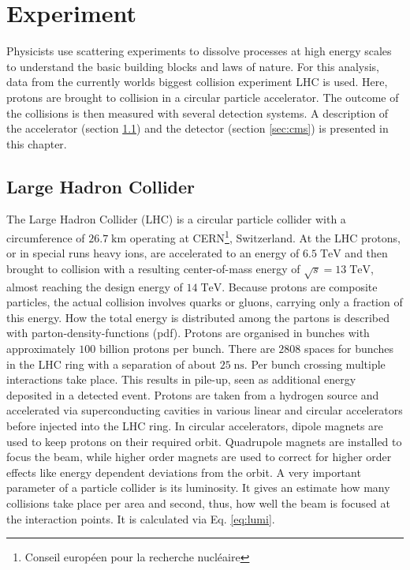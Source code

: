 \chapter{Experiment}
\label{ch:Exp}
	Physicists use scattering experiments to dissolve processes at high energy scales to understand the basic building blocks and laws of nature. For this analysis, data from the currently worlds biggest collision experiment LHC is used. Here, protons are brought to collision in a circular particle accelerator. The outcome of the collisions is then measured with several detection systems. A description of the accelerator (section \ref{sec:lhc}) and the detector (section \ref{sec:cms}) is presented in this chapter.
\section{Large Hadron Collider}
\label{sec:lhc}
	The Large Hadron Collider (LHC) is a circular particle collider with a circumference of $26.7\;\text{km}$ operating at CERN\footnote{Conseil europ\'{e}en pour la recherche nucl\'{e}aire}, Switzerland. At the LHC protons, or in special runs heavy ions, are accelerated to an energy of $6.5\;\text{TeV}$ and then brought to collision with a resulting center-of-mass energy of $\sqrt{s}=13\;\text{TeV}$, almost reaching the design energy of $14\;\text{TeV}$. Because protons are composite particles, the actual collision involves quarks or gluons, carrying only a fraction of this energy. How the total energy is distributed among the partons is described with parton-density-functions (pdf). Protons are organised in bunches with approximately $100$ billion protons per bunch. There are $2808$ spaces for bunches in the LHC ring with a separation of about $25\;\text{ns}$. Per bunch crossing multiple interactions take place. This results in pile-up, seen as additional energy deposited in a detected event.	Protons are taken from a hydrogen source and accelerated via superconducting cavities in various linear and circular accelerators before injected into the LHC ring. In circular accelerators, dipole magnets are used to keep protons on their required orbit. Quadrupole magnets are installed to focus the beam, while higher order magnets are used to correct for higher order effects like energy dependent deviations from the orbit. A very important parameter of a particle collider is its luminosity. It gives an estimate how many collisions take place per area and second, thus, how well the beam is focused at the interaction points. It is calculated via Eq. \ref{eq:lumi}. 
